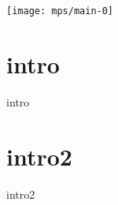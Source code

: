 \documentclass[a4paper, 10 pt]{memoir}
\begin{document}
   \texttt{[image: mps/main-0]}
   
   \section*{intro}
      {intro}

      \section*{intro2}

   {intro2}
\end{document}
